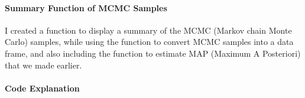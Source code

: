 \documentclass{ltjsbook}
\begin{document}
\paragraph{Summary Function of MCMC Samples}
I created a function to display a summary of the MCMC (Markov chain Monte Carlo) samples, while using the function to convert MCMC samples into a data frame, and also including the function to estimate MAP (Maximum A Posteriori) that we made earlier.

\paragraph{Code Explanation}

\end{document}
